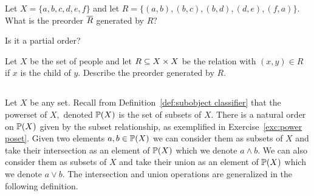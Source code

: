 \documentclass[CT4S-EN-RU]{subfiles}
\begin{document}
\begin{exampleRUS}\label{ex:preorder generated}
\end{exampleRUS}

\begin{exerciseENG}
Let $X=\{a,b,c,d,e,f\}$ and let $R=\{(a,b),(b,c),(b,d),(d,e),(f,a)\}.$ 
\sexc What is the preorder $\ol{R}$ generated by $R?$
\item Is it a partial order?
\endsexc
\end{exerciseENG}

\begin{exerciseRUS}
\end{exerciseRUS}

\begin{exerciseENG}
Let $X$ be the set of people and let $R\ss X\times X$ be the relation with $(x,y)\in R$ if $x$ is the child of $y.$ Describe the preorder generated by $R.$
\end{exerciseENG}

\begin{exerciseRUS}
\end{exerciseRUS}


\subsection{}\label{sec:meets and joins}

\begin{blockENG}
Let $X$ be any set. Recall from Definition~\ref{def:subobject classifier} that the powerset of $X,$ denoted $\PP(X)$ is the set of subsets of $X.$ There is a natural order on $\PP(X)$ given by the subset relationship, as exemplified in Exercise~\ref{exc:power poset}. Given two elements $a,b\in\PP(X)$ we can consider them as subsets of $X$ and take their intersection as an element of $\PP(X)$ which we denote $a\wedge b.$ We can also consider them as subsets of $X$ and take their union as an element of $\PP(X)$ which we denote $a\vee b.$ The intersection and union operations are generalized in the following definition.
\end{blockENG}

\begin{blockRUS}
\end{blockRUS}
\end{document}
